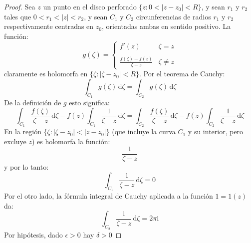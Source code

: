   \begin{proof}
    Sea \(z\) un punto en el disco perforado
    \(\{ z \colon 0 < \lvert z - z_0 \rvert < R \}\),
    y sean \(r_1\) y \(r_2\) tales que
    \(0 < r_1 < \lvert z \rvert < r_2\),
    y sean \(C_1\) y \(C_2\) circunferencias
    de radios \(r_1\) y \(r_2\) respectivamente
    centradas en \(z_0\),
    orientadas ambas en sentido positivo.
    La función:
    \begin{equation*}
      g(\zeta)
       = \begin{cases}
	   \displaystyle f'(z)
				   & \zeta =   z \\
	   \\
	   \displaystyle \frac{f(\zeta) - f(z)}{\zeta - z}
				   & \zeta \ne z
	 \end{cases}
    \end{equation*}
    claramente es holomorfa
    en \(\{ \zeta \colon \lvert \zeta - z_0 \rvert < R \}\).
    Por el teorema de Cauchy:
    \begin{equation*}
      \int_{C_1} g(\zeta) \, \mathrm{d} \zeta
	= \int_{C_2} g(\zeta) \, \mathrm{d} \zeta
    \end{equation*}
    De la definición de \(g\) esto significa:
    \begin{equation*}
      \int_{C_1} \frac{f(\zeta)}{\zeta - z} \, \mathrm{d} \zeta
	-  f(z) \int_{C_1} \frac{1}{\zeta - z} \, \mathrm{d} \zeta
	= \int_{C_2} \frac{f(\zeta)}{\zeta - z} \, \mathrm{d} \zeta
	    -  f(z) \int_{C_2} \frac{1}{\zeta - z}
		      \, \mathrm{d} \zeta
    \end{equation*}
    En la región
      \(\{ \zeta \colon \lvert \zeta - z_0 \rvert
	   < \lvert z - z_0 \rvert \}\)
    (que incluye la curva \(C_1\) y su interior,
     pero excluye \(z\))
    es holomorfa la función:
    \begin{equation*}
      \frac{1}{\zeta - z}
    \end{equation*}
    y por lo tanto:
    \begin{equation*}
      \int_{C_1} \frac{1}{\zeta - z} \, \mathrm{d} \zeta
	= 0
    \end{equation*}
    Por el otro lado,
    la fórmula integral de Cauchy
    aplicada a la función \(1 = 1(z)\) da:%
    \begin{equation*}
      \int_{C_2} \frac{1}{\zeta - z} \, \mathrm{d} \zeta
	= 2 \pi \mathrm{i}
    \end{equation*}
    Por hipótesis,
    dado \(\epsilon > 0\) hay \(\delta > 0\)

\end{proof}
